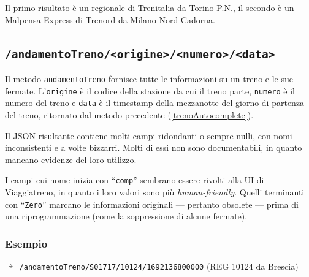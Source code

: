 \documentclass[12pt,italian]{report}
\begin{document}
Il primo risultato è un regionale di Trenitalia da Torino P.N., il
secondo è un Malpensa Express di Trenord da Milano Nord Cadorna.

\subsection{\texttt{/andamentoTreno/<origine>/<numero>/<data>}}
\label{andamentoTreno}

Il metodo \texttt{andamentoTreno} fornisce tutte le informazioni su un
treno e le sue fermate.  L'\texttt{origine} è il codice della stazione
da cui il treno parte, \texttt{numero} è il numero del treno e
\texttt{data} è il timestamp della mezzanotte del giorno di partenza
del treno, ritornato dal metodo precedente (\ref{trenoAutocomplete}).

Il JSON risultante contiene molti campi ridondanti o sempre nulli, con
nomi inconsistenti e a volte bizzarri.  Molti di essi non sono
documentabili, in quanto mancano evidenze del loro utilizzo.

I campi cui nome inizia con ``\texttt{comp}'' sembrano essere rivolti
alla UI di Viaggiatreno, in quanto i loro valori sono più
\textit{human-friendly}. Quelli terminanti con ``\texttt{Zero}''
marcano le informazioni originali --- pertanto obsolete --- prima di
una riprogrammazione (come la soppressione di alcune fermate).

\subsubsection{Esempio}

$\Rsh$ \texttt{/andamentoTreno/S01717/10124/1692136800000} \hfill (REG
10124 da Brescia)
\end{document}
